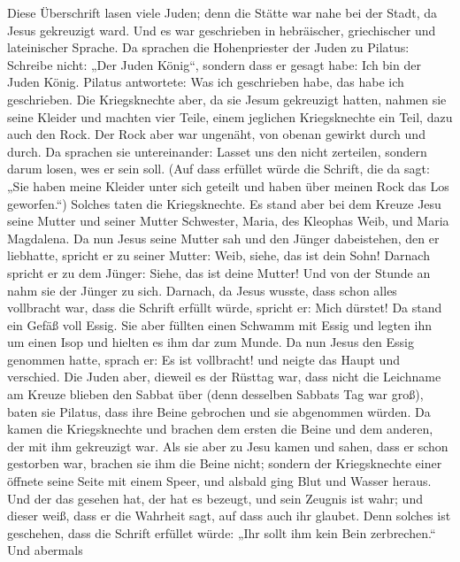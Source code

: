 Diese Überschrift lasen viele Juden; denn die Stätte war nahe bei der
Stadt, da Jesus gekreuzigt ward. Und es war geschrieben in hebräischer,
griechischer und lateinischer Sprache.  Da sprachen die
Hohenpriester der Juden zu Pilatus: Schreibe nicht: „Der Juden König``,
sondern dass er gesagt habe: Ich bin der Juden König. 
Pilatus antwortete: Was ich geschrieben habe, das habe ich geschrieben.
 Die Kriegsknechte aber, da sie Jesum gekreuzigt hatten,
nahmen sie seine Kleider und machten vier Teile, einem jeglichen
Kriegsknechte ein Teil, dazu auch den Rock. Der Rock aber war ungenäht,
von obenan gewirkt durch und durch.  Da sprachen sie
untereinander: Lasset uns den nicht zerteilen, sondern darum losen, wes
er sein soll. (Auf dass erfüllet würde die Schrift, die da sagt: „Sie
haben meine Kleider unter sich geteilt und haben über meinen Rock das
Los geworfen.``) Solches taten die Kriegsknechte.  Es stand
aber bei dem Kreuze Jesu seine Mutter und seiner Mutter Schwester,
Maria, des Kleophas Weib, und Maria Magdalena.  Da nun
Jesus seine Mutter sah und den Jünger dabeistehen, den er liebhatte,
spricht er zu seiner Mutter: Weib, siehe, das ist dein Sohn!
 Darnach spricht er zu dem Jünger: Siehe, das ist deine
Mutter! Und von der Stunde an nahm sie der Jünger zu sich. 
Darnach, da Jesus wusste, dass schon alles vollbracht war, dass die
Schrift erfüllt würde, spricht er: Mich dürstet!  Da stand
ein Gefäß voll Essig. Sie aber füllten einen Schwamm mit Essig und
legten ihn um einen Isop und hielten es ihm dar zum Munde. 
Da nun Jesus den Essig genommen hatte, sprach er: Es ist vollbracht! und
neigte das Haupt und verschied.  Die Juden aber, dieweil es
der Rüsttag war, dass nicht die Leichname am Kreuze blieben den Sabbat
über (denn desselben Sabbats Tag war groß), baten sie Pilatus, dass ihre
Beine gebrochen und sie abgenommen würden.  Da kamen die
Kriegsknechte und brachen dem ersten die Beine und dem anderen, der mit
ihm gekreuzigt war.  Als sie aber zu Jesu kamen und sahen,
dass er schon gestorben war, brachen sie ihm die Beine nicht;
 sondern der Kriegsknechte einer öffnete seine Seite mit
einem Speer, und alsbald ging Blut und Wasser heraus.  Und
der das gesehen hat, der hat es bezeugt, und sein Zeugnis ist wahr; und
dieser weiß, dass er die Wahrheit sagt, auf dass auch ihr glaubet.
 Denn solches ist geschehen, dass die Schrift erfüllet
würde: „Ihr sollt ihm kein Bein zerbrechen.``  Und abermals
